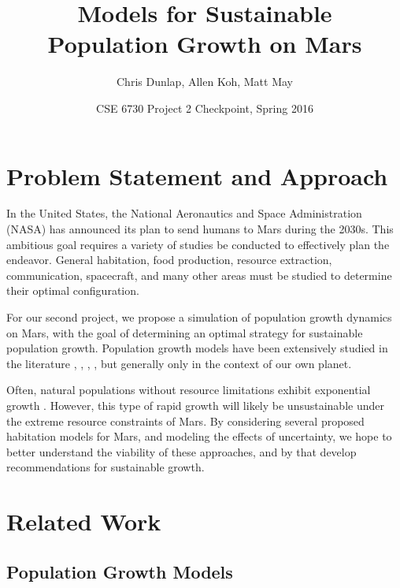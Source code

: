 \documentclass[12pt]{article}
\title{Models for Sustainable \\Population Growth on Mars}
\author{Chris Dunlap, Allen Koh, Matt May}
\date{CSE 6730 Project 2 Checkpoint, Spring 2016}
\begin{document}
\begin{titlepage}
  \maketitle
  \thispagestyle{empty}
\end{titlepage}

\newpage
  \tableofcontents
  \thispagestyle{empty}
\newpage

\section{Problem Statement and Approach}
\label{sec:problem}

In the United States, the National Aeronautics and Space Administration (NASA)
has announced its plan to send humans to Mars during the 2030s. This ambitious
goal requires a variety of studies be conducted to effectively plan the
endeavor. General habitation, food production, resource extraction,
communication, spacecraft, and many other areas must be studied to determine
their optimal configuration.

For our second project, we propose a simulation of population growth dynamics on
Mars, with the goal of determining an optimal strategy for sustainable
population growth. Population growth models have been extensively studied in the
literature \cite{clark1967population}, \cite{caswell2001matrix},
\cite{meadows1992beyond}, \cite{boserup1983population},
\cite{ehrlich1971impact} but generally only in the context of our own planet.

Often, natural populations without resource limitations exhibit exponential
growth \cite{audesirk1996biology}. However, this type of rapid growth will
likely be unsustainable under the extreme resource constraints of Mars.
By considering several proposed habitation models for Mars, and modeling the
effects of uncertainty, we hope to better understand the viability of these
approaches, and by that develop recommendations for sustainable growth.

\section{Related Work}
\label{sec:relatedwork}

\subsection{Population Growth Models}
\end{document}

